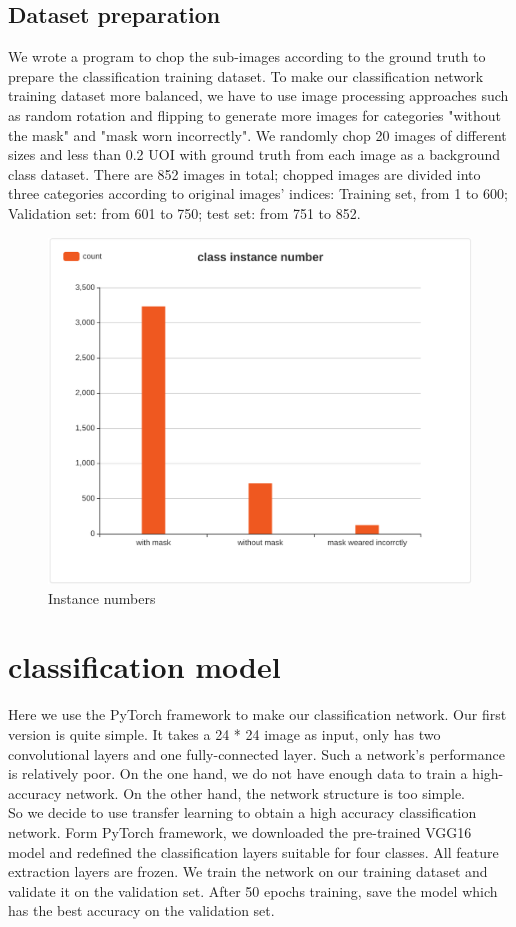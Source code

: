 \documentclass[10pt,a4paper]{report}
\begin{document}
\subsection{Dataset preparation}
We wrote a program to chop the sub-images according to the ground truth to prepare the classification training dataset. To make our classification network training dataset more balanced, we have to use image processing approaches such as random rotation and flipping to generate more images for categories "without the mask" and "mask worn incorrectly". We randomly chop 20 images of different sizes and less than 0.2 UOI with ground truth from each image as a background class dataset. There are 852 images in total; chopped images are divided into three categories according to original images' indices: Training set, from 1 to 600; Validation set: from 601 to 750; test set: from 751 to 852.  
\begin{figure}[hbtp]

\centering
\includegraphics[scale=0.2]{imgs/instance numbers.png}
\caption{Instance numbers}
        \label{fig:Instance numbers}
\end{figure}

\section{classification model}
Here we use the PyTorch framework to make our classification network. Our first version is quite simple. It takes a 24 * 24 image as input, only has two convolutional layers and one fully-connected layer. Such a network's performance is relatively poor. On the one hand, we do not have enough data to train a high-accuracy network. On the other hand, the network structure is too simple.\\
So we decide to use transfer learning to obtain a high accuracy classification network. Form PyTorch framework, we downloaded the pre-trained VGG16 model and redefined the classification layers suitable for four classes. All feature extraction layers are frozen. We train the network on our training dataset and validate it on the validation set. After 50 epochs training, save the model which has the best accuracy on the validation set.
\end{document}

